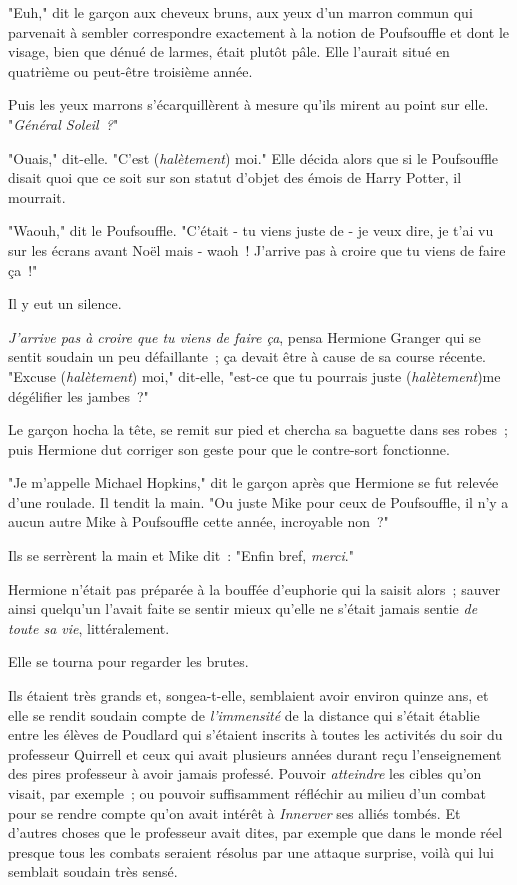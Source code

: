 "Euh," dit le garçon aux cheveux bruns, aux yeux d'un marron commun qui parvenait à sembler correspondre exactement à la notion de Poufsouffle et dont le visage, bien que dénué de larmes, était plutôt pâle. Elle l'aurait situé en quatrième ou peut-être troisième année.

Puis les yeux marrons s'écarquillèrent à mesure qu'ils mirent au point sur elle. "\emph{Général Soleil~?}"

"Ouais," dit-elle. "C'est (\emph{halètement}) moi." Elle décida alors que si le Poufsouffle disait quoi que ce soit sur son statut d'objet des émois de Harry Potter, il mourrait.

"Waouh," dit le Poufsouffle. "C'était - tu viens juste de - je veux dire, je t'ai vu sur les écrans avant Noël mais - waoh~! J'arrive pas à croire que tu viens de faire ça~!"

Il y eut un silence.

\emph{J'arrive pas à croire que tu viens de faire ça}, pensa Hermione Granger qui se sentit soudain un peu défaillante~; ça devait être à cause de sa course récente. "Excuse (\emph{halètement}) moi," dit-elle, "est-ce que tu pourrais juste (\emph{halètement})me dégélifier les jambes~?"

Le garçon hocha la tête, se remit sur pied et chercha sa baguette dans ses robes~; puis Hermione dut corriger son geste pour que le contre-sort fonctionne.

"Je m'appelle Michael Hopkins," dit le garçon après que Hermione se fut relevée d'une roulade. Il tendit la main. "Ou juste Mike pour ceux de Poufsouffle, il n'y a aucun autre Mike à Poufsouffle cette année, incroyable non~?"

Ils se serrèrent la main et Mike dit~: "Enfin bref, \emph{merci}."

Hermione n'était pas préparée à la bouffée d'euphorie qui la saisit alors~; sauver ainsi quelqu'un l'avait faite se sentir mieux qu'elle ne s'était jamais sentie \emph{de toute sa vie}, littéralement.

Elle se tourna pour regarder les brutes.

Ils étaient très grands et, songea-t-elle, semblaient avoir environ quinze ans, et elle se rendit soudain compte de \emph{l'immensité} de la distance qui s'était établie entre les élèves de Poudlard qui s'étaient inscrits à toutes les activités du soir du professeur Quirrell et ceux qui avait plusieurs années durant reçu l'enseignement des pires professeur à avoir jamais professé. Pouvoir \emph{atteindre} les cibles qu'on visait, par exemple~; ou pouvoir suffisamment réfléchir au milieu d'un combat pour se rendre compte qu'on avait intérêt à \emph{Innerver} ses alliés tombés. Et d'autres choses que le professeur avait dites, par exemple que dans le monde réel presque tous les combats seraient résolus par une attaque surprise, voilà qui lui semblait soudain très sensé.

